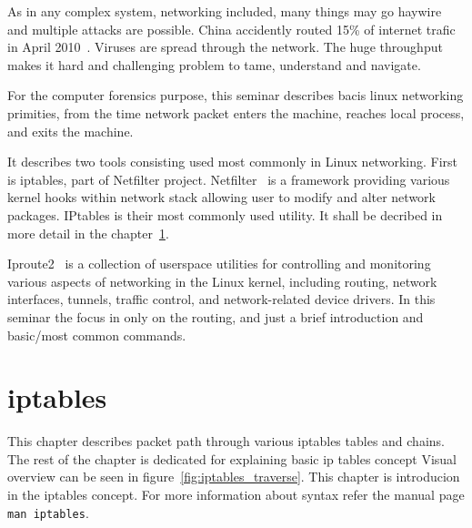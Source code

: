 \documentclass[times, utf8, seminar, english]{fer}
\begin{document}
As in any complex system, networking included, many things may go haywire and multiple attacks are possible. China accidently routed 15\% of internet trafic in April 2010~\cite{HowChina98:online}. Viruses are spread through the network. The huge throughput makes it hard and challenging problem to tame, understand and navigate.

For the computer forensics purpose, this seminar describes bacis linux networking primities, from the time network packet enters the machine, reaches local process, and exits the machine.

It describes two tools consisting used most commonly in Linux networking. First is iptables, part of Netfilter project. Netfilter~\cite{netfilte6:online} is a framework providing various kernel hooks within network stack allowing user to modify and alter network packages. IPtables is their most commonly used utility. It shall be decribed in more detail in the chapter~\ref{chp:iptables}.

Iproute2~\cite{shemming47:online} is a collection of userspace utilities for controlling and monitoring various aspects of networking in the Linux kernel, including routing, network interfaces, tunnels, traffic control, and network-related device drivers. In this seminar the focus in only on the routing, and just a brief introduction and basic/most common commands.

\chapter{iptables}
\label{chp:iptables}
This chapter describes packet path through various iptables tables and chains. The rest of the chapter is dedicated for explaining basic ip tables concept
Visual overview can be seen in figure~\ref{fig:iptables_traverse}. This chapter is introducion in the iptables concept. For more information about syntax refer the manual page \verb|man iptables|.
\end{document}
